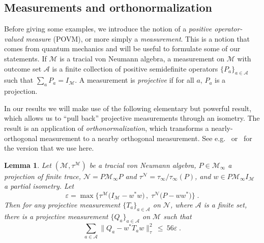\documentclass[11pt]{article}
\newtheorem{lemma}[theorem]{Lemma}
\theoremstyle{definition}
\newcommand{\Id}{\ensuremath{I}}
\newcommand{\mA}{\ensuremath{\mathcal{A}}}
\newcommand{\mM}{\ensuremath{\mathcal{M}}}
\newcommand{\eps}{\varepsilon}
\newcommand{\mN}{\mathcal{N}}
\begin{document}
	\subsection{Measurements and orthonormalization}
	\label{sec:measurements}
	
	Before giving some examples, we introduce the notion of a \emph{positive operator-valued measure} (POVM), or more simply 
 a \emph{measurement}. This is a notion that comes from quantum mechanics and will be useful to formulate some of our statements.  
  If $\mM$ is a tracial von Neumann algebra, a measurement on $\mM$ with outcome set $\mA$ is a finite collection of positive semidefinite operators $\{P_a\}_{a\in \mA}$ such that $\sum_a P_a = \Id_\mM$. A measurement is \emph{projective} if for all $a$, $P_a$ is a projection. 
	
	In our results we will make use of the following elementary but powerful result, which allows us to ``pull back'' projective measurements through an isometry. The result is an application of \emph{orthonormalization}, which transforms a nearly-orthogonal measurement to a nearby orthogonal measurement. See e.g.~\cite{kempe2011parallel,ji2020quantum} or~\cite[Theorem 1.2]{de2021orthogonalization} for the version that we use here. 
	
\begin{lemma}\label{lem:pull-back}
Let  $(\mM,\tau^\mM)$ be a tracial von Neumann algebra, $P\in\mM_\infty$ a projection of finite trace, $\mN=P\mM_\infty P$ and $\tau^\mN=\tau_\infty/\tau_\infty(P)$, and $w\in P \mM_\infty \Id_\mM$ a partial isometry. Let 
\[ \eps = \max\big\{ \tau^\mM\big(\Id_\mM - w^* w\big)\,,\;\tau^\mN\big( P- w w^*\big)\big\}\;.\] 
 Then for any projective measurement $\{T_a\}_{a \in \mA}$ on $\mN$, where $\mA$ is a finite set, there is a projective measurement $\{Q_a\}_{a \in \mA}$ on $\mM$ such that 
\begin{equation}
\label{eq:pull-back} \sum_{a \in \mA} \big\| Q_a - w^* T_a w\big\|_{\tau}^2 \,\leq \ 56\eps\;.
\end{equation}
\end{lemma}	
\end{document}
